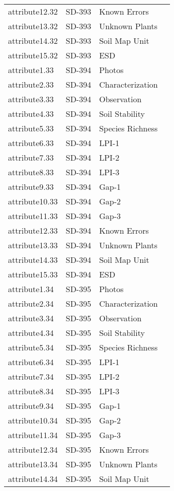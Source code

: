 \documentclass[
]{article}
\begin{document}
\begin{longtable}[]{@{}llll@{}}
attribute12.32 & SD-393 & Known Errors & \\
attribute13.32 & SD-393 & Unknown Plants & \\
attribute14.32 & SD-393 & Soil Map Unit & \\
attribute15.32 & SD-393 & ESD & \\
attribute1.33 & SD-394 & Photos & \\
attribute2.33 & SD-394 & Characterization & \\
attribute3.33 & SD-394 & Observation & \\
attribute4.33 & SD-394 & Soil Stability & \\
attribute5.33 & SD-394 & Species Richness & \\
attribute6.33 & SD-394 & LPI-1 & \\
attribute7.33 & SD-394 & LPI-2 & \\
attribute8.33 & SD-394 & LPI-3 & \\
attribute9.33 & SD-394 & Gap-1 & \\
attribute10.33 & SD-394 & Gap-2 & \\
attribute11.33 & SD-394 & Gap-3 & \\
attribute12.33 & SD-394 & Known Errors & \\
attribute13.33 & SD-394 & Unknown Plants & \\
attribute14.33 & SD-394 & Soil Map Unit & \\
attribute15.33 & SD-394 & ESD & \\
attribute1.34 & SD-395 & Photos & \\
attribute2.34 & SD-395 & Characterization & \\
attribute3.34 & SD-395 & Observation & \\
attribute4.34 & SD-395 & Soil Stability & \\
attribute5.34 & SD-395 & Species Richness & \\
attribute6.34 & SD-395 & LPI-1 & \\
attribute7.34 & SD-395 & LPI-2 & \\
attribute8.34 & SD-395 & LPI-3 & \\
attribute9.34 & SD-395 & Gap-1 & \\
attribute10.34 & SD-395 & Gap-2 & \\
attribute11.34 & SD-395 & Gap-3 & \\
attribute12.34 & SD-395 & Known Errors & \\
attribute13.34 & SD-395 & Unknown Plants & \\
attribute14.34 & SD-395 & Soil Map Unit & \\

\end{longtable}
\end{document}
